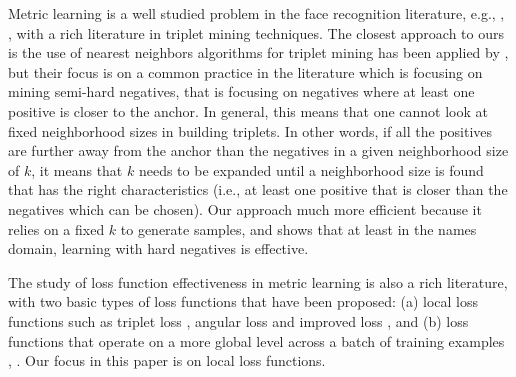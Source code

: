 Metric learning is a well studied problem in the face recognition literature, e.g., \cite{DBLP:conf/cvpr/2014}, \cite{DBLP:conf/cvpr/SchroffKP15}, with a rich literature in triplet mining techniques.  The closest approach to ours is the use of nearest neighbors algorithms for triplet mining has been applied by \cite{DBLP:journals/corr/KumarHC0D17}, but their focus is on a common practice in the literature which is focusing on mining semi-hard negatives, that is focusing on negatives where at least one positive is closer to the anchor.  In general, this means that one cannot look at fixed neighborhood sizes in building triplets.  In other words, if all the positives are further away from the anchor than the negatives in a given neighborhood size of $k$, it means that $k$ needs to be expanded until a neighborhood size is found that has the right characteristics (i.e., at least one positive that is closer than the negatives which can be chosen).  Our approach much more efficient because it relies on a fixed $k$ to generate samples, and shows that at least in the names domain, learning with hard negatives is effective.

The study of loss function effectiveness in metric learning is also a rich literature, with two basic types of loss functions that have been proposed: (a) local loss functions such as triplet loss \cite{DBLP:conf/cvpr/SchroffKP15}, angular loss \cite{Zhang:2016:DML:3088616.3088665} and improved loss \cite{DBLP:journals/corr/abs-1708-01682}, and (b) loss functions that operate on a more global level across a batch of training examples \cite{NIPS2016_6200}, \cite{songCVPR17}.  Our focus in this paper is on local loss functions.

